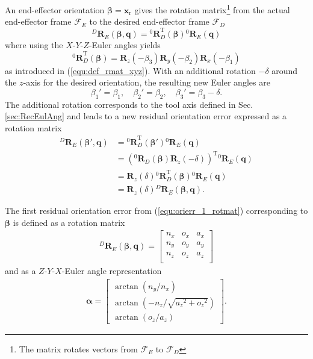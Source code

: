 \documentclass[twocolumn,10pt]{IFTOMM}
\newcommand{\bm}[1]{\boldsymbol{#1}}
\newcommand{\rotmat}[2]{{{ }^{#1}\boldsymbol{R}}_{#2}}
\newcommand{\transp}[0]{{\mathrm{T}}}
\newcommand{\ks}[1]{{\mathcal{F}}_{#1}}
\begin{document}
An end-effector orientation $\bm{\beta}=\bm{x}_{\mathrm{r}}$ gives the rotation matrix\footnote{The matrix rotates vectors from $\ks{E}$ to $\ks{D}$} from the actual end-effector frame $\ks{E}$ to the desired end-effector frame $\ks{D}$
%
\begin{equation}
\rotmat{D}{E}(\bm{\beta},\bm{q})
= 
\rotmat{0}{D}^\transp (\bm{\beta})\rotmat{0}{E}(\bm{q})
\label{equ:orierr_1_rotmat}
\end{equation}
%
where using the $X$-$Y$-$Z$-Euler angles yields
%
\begin{equation}
\rotmat{0}{D}^\transp(\bm{\beta})
=
\bm{R}_z(-\beta_3) \bm{R}_y(-\beta_2) \bm{R}_x(-\beta_1)
\end{equation}
%
as introduced in (\ref{equ:def_rmat_xyz}).
With an additional rotation $-\delta$ around the $z$-axis for the desired orientation, the resulting new Euler angles are
%
\begin{equation}
\beta_1'=\beta_1,  \quad \beta_2'=\beta_2,  \quad \beta_3'=\beta_3-\delta.
\end{equation}
%
The additional rotation corresponds to the tool axis defined in Sec.\,\ref{sec:RecEulAng} %
and leads to a new residual orientation error expressed as a rotation matrix
%
\begin{align}
\rotmat{D}{E}(\bm{\beta}',\bm{q})
&=
\rotmat{0}{D}^\transp (\bm{\beta}') \rotmat{0}{E}(\bm{q}) \nonumber\\
&=
\left(\rotmat{0}{D}(\bm{\beta})\bm{R}_z(-\delta)\right)^\transp \rotmat{0}{E}(\bm{q}) \nonumber \\
&=
\bm{R}_z(\delta) \rotmat{0}{D}^\transp (\bm{\beta}) \rotmat{0}{E}(\bm{q}) \nonumber \\
&=
\bm{R}_z(\delta) \rotmat{D}{E}(\bm{\beta},\bm{q}).
\label{equ:orierr_2_rotmat}
\end{align}

The first residual orientation error from (\ref{equ:orierr_1_rotmat}) corresponding to $\bm{\beta}$ is defined as a rotation matrix
%
\begin{align}
\rotmat{D}{E}(\bm{\beta},\bm{q})
=
\begin{bmatrix}
{n_x}&{o_x}&{a_x} \\
{n_y}&{o_y}&{a_y} \\ 
{n_z}&{o_z}&{a_z} \\ 
\end{bmatrix}
\label{equ:orierr_1_rotmat_def}
\end{align}
%
and as a $Z$-$Y$-$X$-Euler angle representation
%
\begin{align}
\bm{\alpha} =
\begin{bmatrix}
\arctan \left( {n_y} / { n_x} \right) \\ 
\arctan \left( -{n_z} / \sqrt {{{a_z}}^{2}+{{ o_z}}^{2}} \right) \\ 
\arctan \left( {o_z} / {a_z} \right)
\end{bmatrix}.
\label{equ:alpha_xyz}
\end{align}
\end{document}
